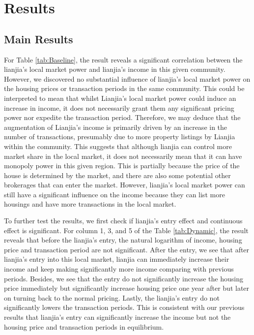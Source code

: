 \documentclass[12pt]{article}
\begin{document}
\section{Results \label{sec:results}}

\subsection{Main Results \label{sec:mainresults}}

For Table \ref{tab:Baseline}, the result reveals a significant correlation between the lianjia's local market power and lianjia's income in this given community. However, we discovered no substantial influence of lianjia's local market power on the housing prices or transaction periods in the same community. This could be interpreted to mean that whilst Lianjia's local market power could induce an increase in income, it does not necessarily grant them any significant pricing power nor expedite the transaction period. Therefore, we may deduce that the augmentation of Lianjia's income is primarily driven by an increase in the number of transactions, presumably due to more property listings by Lianjia within the community. This suggests that although lianjia can control more market share in the local market, it does not necessarily mean that it can have monopoly power in this given region. This is partially because the price of the house is determined by the market, and there are also some potential other brokerages that can enter the market. However, lianjia's local market power can still have a significant influence on the income because they can list more housings and have more transactions in the local market.

To further test the results, we first check if lianjia's entry effect and continuous effect is significant. For column 1, 3, and 5 of the Table \ref{tab:Dynamic}, the result reveals that before the lianjia's entry, the natural logarithm of income, housing price and transaction period are not significant. After the entry, we see that after lianjia's entry into this local market, lianjia can immediately increase their income and keep making significantly more income comparing with previous periods. Besides, we see that the entry do not significantly increase the housing price immediately but significantly increase housing price one year after but later on turning back to the normal pricing. Lastly, the lianjia's entry do not significantly lowers the transaction periods. This is consistent with our previous results that lianjia's entry can significantly increase the income but not the housing price and transaction periods in equilibrium.
\end{document}
